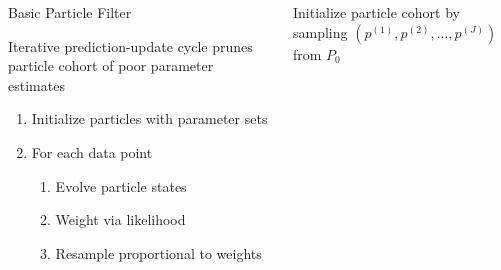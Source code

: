 \documentclass[12pt]{beamer}
\begin{document}
\begin{frame}

	\begin{columns}
		\begin{column}{0.5\textwidth}

			\large
			Basic Particle Filter
			\vspace{\baselineskip}
			\footnotesize

			Iterative prediction-update cycle prunes particle cohort of poor parameter estimates

			\begin{enumerate}
				\item Initialize particles with parameter sets
				\item For each data point
				\begin{enumerate}
					\footnotesize
					\item Evolve particle states
					\item Weight via likelihood
					\item Resample proportional to weights
				\end{enumerate}
			\end{enumerate}
			
			
		\end{column}
		\begin{column}{0.5\textwidth}

			\tiny
			\begin{algorithm}[H]

		        \BlankLine

		        \DontPrintSemicolon


		        \BlankLine

		        Initialize particle cohort by sampling $(p^{(1)}, p^{(2)}, ..., p^{(J)})$ from $P_0$

		        \BlankLine

\end{algorithm}
\end{column}
\end{columns}
\end{frame}
\end{document}
